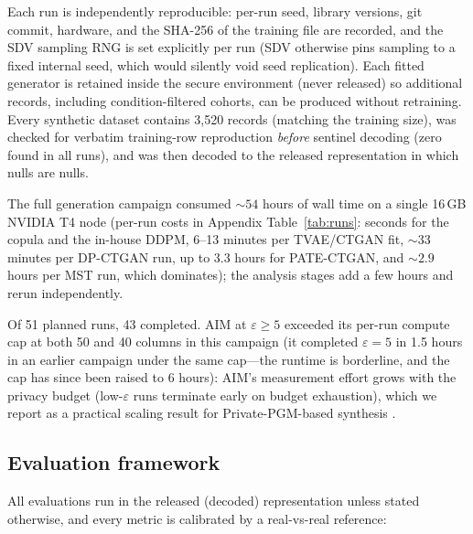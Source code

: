 \documentclass[11pt,a4paper]{article}
\newcommand{\eps}{\ensuremath{\varepsilon}}
\begin{document}
Each run is independently reproducible: per-run seed, library versions, git commit,
hardware, and the SHA-256 of the training file are recorded, and the SDV sampling RNG
is set explicitly per run (SDV otherwise pins sampling to a fixed internal seed,
which would silently void seed replication). Each fitted generator is retained inside
the secure environment (never released) so additional records, including
condition-filtered cohorts, can be produced without retraining. Every synthetic
dataset contains 3{,}520 records (matching the training size), was checked for
verbatim training-row reproduction \emph{before} sentinel decoding (zero found in
all runs), and was then decoded to the released representation in which nulls are
nulls.

The full generation campaign consumed ${\sim}54$ hours of wall time on a single
16\,GB NVIDIA T4 node (per-run costs in Appendix Table~\ref{tab:runs}: seconds for
the copula and the in-house DDPM, 6--13 minutes per TVAE/CTGAN fit, ${\sim}33$
minutes per DP-CTGAN run, up to 3.3 hours for PATE-CTGAN, and ${\sim}2.9$ hours
per MST run, which dominates); the analysis stages add a few hours and rerun
independently.

Of 51 planned runs, 43 completed. AIM at $\eps \geq 5$ exceeded its per-run
compute cap at both 50 and 40 columns in this campaign (it completed $\eps = 5$ in
1.5 hours in an earlier campaign under the same cap---the runtime is borderline,
and the cap has since been raised to 6 hours): AIM's measurement effort grows with
the privacy budget (low-\eps{} runs terminate early on budget exhaustion), which we
report as a practical scaling result for Private-PGM-based synthesis
\citep{mckenna2019graphical}.

\subsection{Evaluation framework}

All evaluations run in the released (decoded) representation unless stated
otherwise, and every metric is calibrated by a real-vs-real reference:
\end{document}
